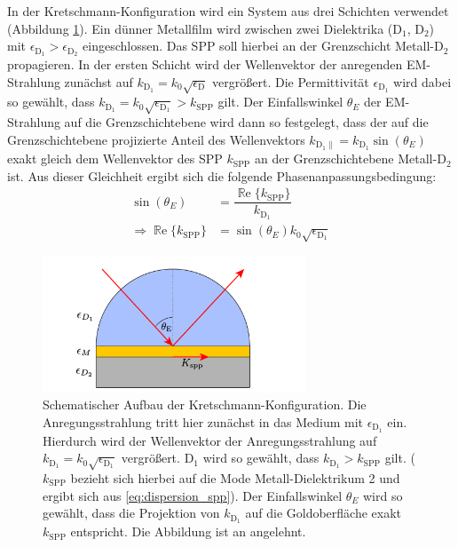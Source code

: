 \documentclass[a4paper, titlepage,  ngerman, fullpage]{book}
\renewcommand{\Re}{\operatorname{\mathbb{R}e}}
\begin{document}
	In der Kretschmann-Konfiguration wird ein System aus drei Schichten verwendet (Abbildung \ref{fig:kretschman}). Ein dünner Metallfilm wird zwischen zwei Dielektrika ($\mathrm{D}_1$, $\mathrm{D}_2$) mit $\epsilon_{\mathrm{D}_1} > \epsilon_{\mathrm{D}_2}$ eingeschlossen. Das SPP soll hierbei an der Grenzschicht Metall-$\mathrm{D}_2$ propagieren. In der ersten Schicht wird der Wellenvektor der anregenden EM-Strahlung zunächst auf $k_\mathrm{\mathrm{D}_1} = k_0 \sqrt{\epsilon_\mathrm{D}}$ vergrößert. Die Permittivität $\epsilon_{\mathrm{D}_1}$ wird dabei so gewählt, dass $k_\mathrm{\mathrm{D}_1} = k_0 \sqrt{\epsilon_{\mathrm{D}_1}} > k_\mathrm{SPP}$ gilt. Der Einfallswinkel $\theta_E$ der EM-Strahlung auf die Grenzschichtebene wird dann so festgelegt, dass der auf die Grenzschichtebene projizierte Anteil des Wellenvektors $k_{\mathrm{\mathrm{D}_1}\parallel} = k_{\mathrm{\mathrm{D}_1}} \sin(\theta_E)$ exakt gleich dem Wellenvektor des SPP $k_\mathrm{SPP}$ an der Grenzschichtebene Metall-$\mathrm{D}_2$ ist. Aus dieser Gleichheit ergibt sich die folgende Phasenanpassungsbedingung: 
	\begin{align}
		\label{eq:phase_condition_kretschmann}
		\sin(\theta_E) &= \dfrac{\Re\{k_{\mathrm{SPP}}\}}{k_{\mathrm{D}_1}}\\
		\Rightarrow \Re\{k_{\mathrm{SPP}}\} &= \sin(\theta_E) k_0 \sqrt{\epsilon_{\mathrm{D}_1}}
	\end{align}  
	\begin{figure} 
		\centering
		\includegraphics[width=0.7\textwidth]{figures/Kretschmann.pdf}
		\caption[Kretschmann-Konfiguration]{Schematischer Aufbau der Kretschmann-Konfiguration. Die Anregungsstrahlung tritt hier zunächst in das Medium mit $\epsilon_{\mathrm{D}_1}$ ein. Hierdurch wird der Wellenvektor der Anregungsstrahlung auf $k_{\mathrm{D}_1}=k_0\sqrt{\epsilon_{\mathrm{D}_1}}$ vergrößert. $\mathrm{D}_1$ wird so gewählt, dass $k_{\mathrm{D}_1}> k_{\mathrm{SPP}}$ gilt. ($k_{\mathrm{SPP}}$ bezieht sich hierbei auf die Mode Metall-Dielektrikum 2 und ergibt sich aus \eqref{eq:dispersion_spp}). Der Einfallswinkel $\theta_E$ wird so gewählt, dass die Projektion von $k_{\mathrm{D}_1}$ auf die Goldoberfläche exakt $k_{\mathrm{SPP}}$ entspricht. Die Abbildung ist an \cite{Jaruschewski.2020} angelehnt.}
		\label{fig:kretschman}
	\end{figure}
\end{document}
